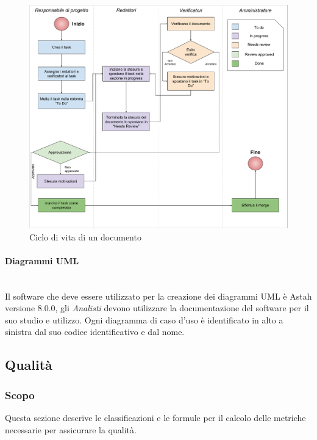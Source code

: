 \begin{figure}[H]
\centering\includegraphics[width=17cm,trim=2 2 2 2, clip]{img/cicloVitaDocumentoAsana.pdf}
\caption{Ciclo di vita di un documento}
\label{fig:document_lifecycle}
\end{figure}

\paragraph{Diagrammi UML}\mbox{}\\
Il software che deve essere utilizzato per la creazione dei diagrammi UML è Astah versione 8.0.0, gli \textit{Analisti} devono utilizzare la documentazione del software per il suo studio e utilizzo.
Ogni diagramma di caso d’uso è identificato in alto a sinistra dal suo codice identificativo e dal nome.

\subsection{Qualità}
\subsubsection{Scopo}
Questa sezione descrive le classificazioni e le formule per il calcolo delle metriche necessarie per assicurare la qualità.

